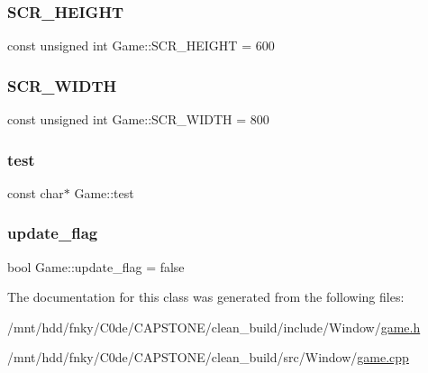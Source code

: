 \subsubsection{\texorpdfstring{S\+C\+R\+\_\+\+H\+E\+I\+G\+HT}{SCR\_HEIGHT}}
{\footnotesize\ttfamily const unsigned int Game\+::\+S\+C\+R\+\_\+\+H\+E\+I\+G\+HT = 600\hspace{0.3cm}{\ttfamily [private]}}

\mbox{\label{classGame_ad2b1545413788030fd7e6188997f6f2e}} 
\subsubsection{\texorpdfstring{S\+C\+R\+\_\+\+W\+I\+D\+TH}{SCR\_WIDTH}}
{\footnotesize\ttfamily const unsigned int Game\+::\+S\+C\+R\+\_\+\+W\+I\+D\+TH = 800\hspace{0.3cm}{\ttfamily [private]}}

\mbox{\label{classGame_a6417f1b9fcb97308276693f4fe8eca64}} 
\subsubsection{\texorpdfstring{test}{test}}
{\footnotesize\ttfamily const char$\ast$ Game\+::test\hspace{0.3cm}{\ttfamily [private]}}

\mbox{\label{classGame_a8a125a8e29c0b6ed556ad66a5449b23b}} 
\subsubsection{\texorpdfstring{update\+\_\+flag}{update\_flag}}
{\footnotesize\ttfamily bool Game\+::update\+\_\+flag = false\hspace{0.3cm}{\ttfamily [private]}}



The documentation for this class was generated from the following files\+:\begin{DoxyCompactItemize}
\item 
/mnt/hdd/fnky/\+C0de/\+C\+A\+P\+S\+T\+O\+N\+E/clean\+\_\+build/include/\+Window/\hyperlink{game_8h}{game.\+h}\item 
/mnt/hdd/fnky/\+C0de/\+C\+A\+P\+S\+T\+O\+N\+E/clean\+\_\+build/src/\+Window/\hyperlink{game_8cpp}{game.\+cpp}\end{DoxyCompactItemize}
